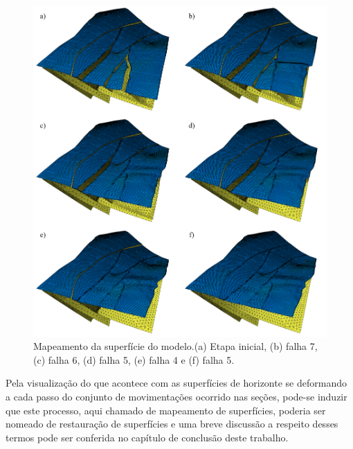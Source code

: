 \begin{figure} [H]
  \begin{center}
    \includegraphics[width=\textwidth]{images/fig-example-2-13}
    \caption{Mapeamento da superfície do modelo.(a) Etapa inicial, (b) falha 7, (c) falha 6, (d) falha 5, (e) falha 4 e (f) falha 5.}\label{fig-example-2-13}
  \end{center}
\end{figure}

Pela visualização do que acontece com as superfícies de horizonte se deformando a cada passo do conjunto de movimentações ocorrido nas seções, pode-se induzir que este processo, aqui chamado de mapeamento de superfícies, poderia ser nomeado de restauração de superfícies e uma breve discussão a respeito desses termos pode ser conferida no capítulo de conclusão deste trabalho.


